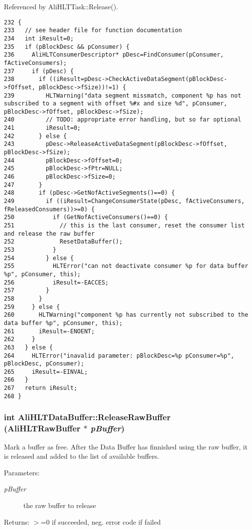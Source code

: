 Referenced by Ali\-HLTTask::Release().

\footnotesize\begin{verbatim}232 {
233   // see header file for function documentation
234   int iResult=0;
235   if (pBlockDesc && pConsumer) {
236     AliHLTConsumerDescriptor* pDesc=FindConsumer(pConsumer, fActiveConsumers);
237     if (pDesc) {
238       if ((iResult=pDesc->CheckActiveDataSegment(pBlockDesc->fOffset, pBlockDesc->fSize))!=1) {
239         HLTWarning("data segment missmatch, component %p has not subscribed to a segment with offset %#x and size %d", pConsumer, pBlockDesc->fOffset, pBlockDesc->fSize);
240         // TODO: appropriate error handling, but so far optional
241         iResult=0;
242       } else {
243         pDesc->ReleaseActiveDataSegment(pBlockDesc->fOffset, pBlockDesc->fSize);
244         pBlockDesc->fOffset=0;
245         pBlockDesc->fPtr=NULL;
246         pBlockDesc->fSize=0;
247       }
248       if (pDesc->GetNofActiveSegments()==0) {
249         if ((iResult=ChangeConsumerState(pDesc, fActiveConsumers, fReleasedConsumers))>=0) {
250           if (GetNofActiveConsumers()==0) {
251             // this is the last consumer, reset the consumer list and release the raw buffer
252             ResetDataBuffer();
253           }
254         } else {
255           HLTError("can not deactivate consumer %p for data buffer %p", pConsumer, this);
256           iResult=-EACCES;
257         }
258       }
259     } else {
260       HLTWarning("component %p has currently not subscribed to the data buffer %p", pConsumer, this);
261       iResult=-ENOENT;
262     }
263   } else {
264     HLTError("inavalid parameter: pBlockDesc=%p pConsumer=%p", pBlockDesc, pConsumer);
265     iResult=-EINVAL;
266   }
267   return iResult;
268 }
\end{verbatim}\normalsize 


\subsubsection{\setlength{\rightskip}{0pt plus 5cm}int Ali\-HLTData\-Buffer::Release\-Raw\-Buffer ({\bf Ali\-HLTRaw\-Buffer} $\ast$ {\em p\-Buffer})\hspace{0.3cm}{\tt  [static, private]}}\label{classAliHLTDataBuffer_h1}


Mark a buffer as free. After the Data Buffer has finnished using the raw buffer, it is released and added to the list of available buffers. \begin{Desc}
\item[Parameters:]
\begin{description}
\item[{\em p\-Buffer}]the raw buffer to release \end{description}
\end{Desc}
\begin{Desc}
\item[Returns:]$>$=0 if succeeded, neg. error code if failed \end{Desc}


